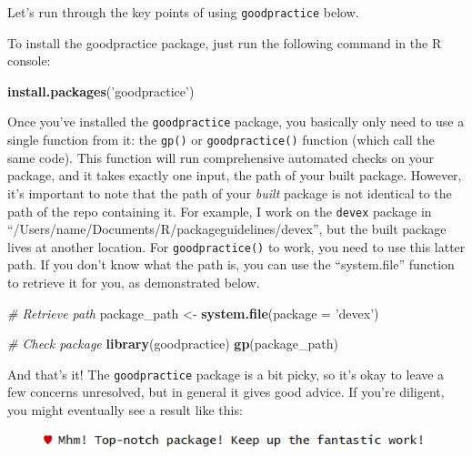 \documentclass[]{book}
\newenvironment{Shaded}{\begin{snugshade}}{\end{snugshade}}
\newcommand{\KeywordTok}[1]{\textcolor[rgb]{0.13,0.29,0.53}{\textbf{#1}}}
\newcommand{\DataTypeTok}[1]{\textcolor[rgb]{0.13,0.29,0.53}{#1}}
\newcommand{\StringTok}[1]{\textcolor[rgb]{0.31,0.60,0.02}{#1}}
\newcommand{\CommentTok}[1]{\textcolor[rgb]{0.56,0.35,0.01}{\textit{#1}}}
\newcommand{\NormalTok}[1]{#1}
\begin{document}
Let's run through the key points of using \texttt{goodpractice} below.

To install the goodpractice package, just run the following command in
the R console:

\begin{Shaded}
\begin{Highlighting}[]
\KeywordTok{install.packages}\NormalTok{(}\StringTok{'goodpractice'}\NormalTok{)}
\end{Highlighting}
\end{Shaded}

Once you've installed the \texttt{goodpractice} package, you basically
only need to use a single function from it: the \texttt{gp()} or
\texttt{goodpractice()} function (which call the same code). This
function will run comprehensive automated checks on your package, and it
takes exactly one input, the path of your built package. However, it's
important to note that the path of your \emph{built} package is not
identical to the path of the repo containing it. For example, I work on
the \texttt{devex} package in
``/Users/name/Documents/R/packageguidelines/devex'', but the built
package lives at another location. For \texttt{goodpractice()} to work,
you need to use this latter path. If you don't know what the path is,
you can use the ``system.file'' function to retrieve it for you, as
demonstrated below.

\begin{Shaded}
\begin{Highlighting}[]
\CommentTok{# Retrieve path}
\NormalTok{package_path <-}\StringTok{ }\KeywordTok{system.file}\NormalTok{(}\DataTypeTok{package =} \StringTok{'devex'}\NormalTok{)}

\CommentTok{# Check package}
\KeywordTok{library}\NormalTok{(goodpractice)}
\KeywordTok{gp}\NormalTok{(package_path)}
\end{Highlighting}
\end{Shaded}

And that's it! The \texttt{goodpractice} package is a bit picky, so it's
okay to leave a few concerns unresolved, but in general it gives good
advice. If you're diligent, you might eventually see a result like this:

\begin{figure}
\centering
\includegraphics{images/testSS/goodpractice2.PNG}
\caption{}
\end{figure}
\end{document}
